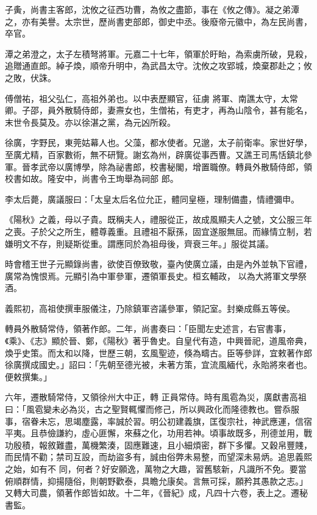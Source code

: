 \begin{pinyinscope}
 子夤，尚書主客郎，沈攸之征西功曹，為攸之盡節，事在《攸之傳》。凝之弟潭之，亦有美譽。太宗世，歷尚書吏部郎，御史中丞。後廢帝元徽中，為左民尚書，卒官。



 潭之弟澄之，太子左積弩將軍。元嘉二十七年，領軍於盱眙，為索虜所破，見殺，追贈通直郎。綽子煥，順帝升明中，為武昌太守。沈攸之攻郢城，煥棄郡赴之；攸之敗，伏誅。



 傅僧祐，祖父弘仁，高祖外弟也。以中表歷顯官，征虜
 將軍、南譙太守，太常卿。子邵，員外散騎侍郎，妻燾女也，生僧祐，有吏才，再為山陰令，甚有能名，末世令長莫及。亦以徐湛之黨，為元凶所殺。



 徐廣，字野民，東莞姑幕人也。父藻，都水使者。兄邈，太子前衛率。家世好學，至廣尤精，百家數術，無不研覽。謝玄為州，辟廣從事西曹。又譙王司馬恬鎮北參軍。晉孝武帝以廣博學，除為祕書郎，校書秘閣，增置職僚。轉員外散騎侍郎，領校書如故。隆安中，尚書令王珣舉為祠部
 郎。



 李太后薨，廣議服曰：「太皇太后名位允正，體同皇極，理制備盡，情禮彌申。



 《陽秋》之義，母以子貴。既稱夫人，禮服從正，故成風顯夫人之號，文公服三年之喪。子於父之所生，體尊義重。且禮祖不厭孫，固宜遂服無屈。而緣情立制，若嫌明文不存，則疑斯從重。謂應同於為祖母後，齊衰三年。」服從其議。



 時會稽王世子元顯錄尚書，欲使百僚致敬，臺內使廣立議，由是內外並執下官禮，廣常為愧恨焉。元顯引為中軍參軍，遷領軍長史。桓玄輔政，
 以為大將軍文學祭酒。



 義熙初，高祖使撰車服儀注，乃除鎮軍咨議參軍，領記室。封樂成縣五等侯。



 轉員外散騎常侍，領著作郎。二年，尚書奏曰：「臣聞左史述言，右官書事，《乘》、《志》顯於晉、鄭，《陽秋》著乎魯史。自皇代有造，中興晉祀，道風帝典，煥乎史策。而太和以降，世歷三朝，玄風聖迹，倏為疇古。臣等參詳，宜敕著作郎徐廣撰成國史。」詔曰：「先朝至德光被，未著方策，宜流風緬代，永貽將來者也。便敕撰集。」



 六年，遷散騎常侍，又領徐州大中正，轉
 正員常侍。時有風雹為災，廣獻書高祖曰：「風雹變未必為災，古之聖賢輒懼而修己，所以興政化而隆德教也。嘗忝服事，宿眷未忘，思竭塵露，率誠於習。明公初建義旗，匡復宗社，神武應運，信宿平夷。且恭儉謙約，虛心匪懈，來蘇之化，功用若神。頃事故既多，刑德並用，戰功殷積，報敘難盡，萬機繁湊，固應難速，且小細煩密，群下多懼。又穀帛豐賤，而民情不勸；禁司互設，而劫盜多有，誠由俗弊未易整，而望深未易炳。追思義熙之始，如有不
 同，何者？好安願逸，萬物之大趣，習舊駭新，凡識所不免。要當俯順群情，抑揚隨俗，則朝野歡泰，具瞻允康矣。言無可採，願矜其愚款之志。」又轉大司農，領著作郎皆如故。十二年，《晉紀》成，凡四十六卷，表上之。遷秘書監。




\end{pinyinscope}
